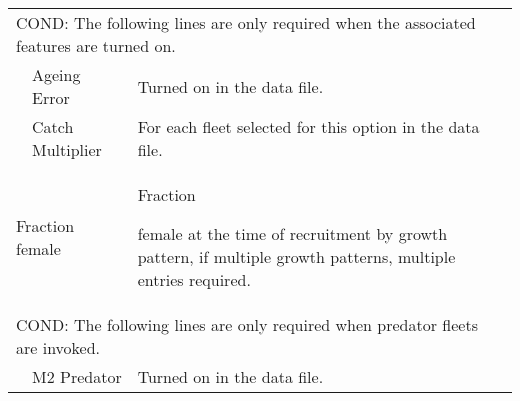 \begin{longtable}{p{1cm} p{2.25cm} p{10cm}}
	\multicolumn{3}{l}{COND: The following lines are only required when the associated features are turned on.}\Tstrut\\
	& Ageing Error & Turned on in the data file.\\
	& Catch Multiplier & For each fleet selected for this option in the data file.\\
	\hline

	\multicolumn{2}{l}{Fraction female}\Tstrut & \hypertarget{SexRatio}{Fraction} female at the time of recruitment by growth pattern, if multiple growth patterns, multiple entries required.\Bstrut\\
	\hline
	
	\multicolumn{3}{l}{COND: The following lines are only required when predator fleets are invoked.}\Tstrut\\
	& M2 Predator & Turned on in the data file.\\
	\hline
\end{longtable}


